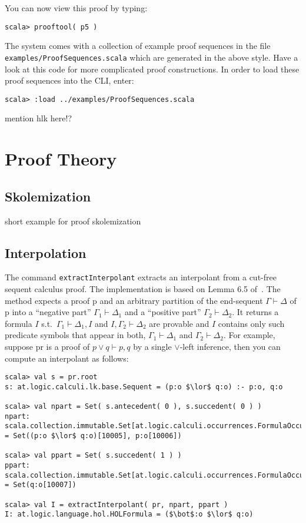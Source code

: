 \documentclass[a4paper,11pt]{article}
\newcommand{\seq}{\vdash}	%
\renewcommand{\lor}{\vee}
\newenvironment{meta}{\color{red}}{\color{black}}
\begin{document}
%
You can now view this proof by typing:
\begin{lstlisting}
scala> prooftool( p5 )
\end{lstlisting}

The system comes with a collection of example proof sequences in the file
{\tt examples/ProofSequences.scala} which are generated in the above style.
Have a look at this code for more complicated proof constructions. In order
to load these proof sequences into the CLI, enter:
\begin{lstlisting}
scala> :load ../examples/ProofSequences.scala
\end{lstlisting}

\begin{meta}
mention hlk here!?
\end{meta}


\section{Proof Theory}

\subsection{Skolemization}

\begin{meta}
short example for proof skolemization 
\end{meta}


\subsection{Interpolation}

The command \texttt{extractInterpolant} extracts an interpolant from a cut-free
sequent calculus proof. The implementation is based on Lemma 6.5 of~\cite{Takeuti87Proof}. The method expects
a proof p and an arbitrary partition of the end-sequent $\Gamma \seq \Delta$ of p into a 
``negative part'' $\Gamma_1\seq\Delta_1$ and a ``positive part'' $\Gamma_2 \seq \Delta_2$.
It returns a formula $I$ s.t.\ $\Gamma_1\seq\Delta_1, I$ and $I,\Gamma_2\seq\Delta_2$
are provable and $I$ contains only such predicate symbols that appear in both, $\Gamma_1\seq\Delta_1$
and $\Gamma_2\seq\Delta_2$. For example, suppose pr is a proof of $p \lor q \seq p, q$
by a single $\lor$-left inference, then you can compute an interpolant as follows:
\begin{lstlisting}
scala> val s = pr.root
s: at.logic.calculi.lk.base.Sequent = (p:o $\lor$ q:o) :- p:o, q:o

scala> val npart = Set( s.antecedent( 0 ), s.succedent( 0 ) )
npart: scala.collection.immutable.Set[at.logic.calculi.occurrences.FormulaOccurrence] = Set((p:o $\lor$ q:o)[10005], p:o[10006])

scala> val ppart = Set( s.succedent( 1 ) )
ppart: scala.collection.immutable.Set[at.logic.calculi.occurrences.FormulaOccurrence] = Set(q:o[10007])

scala> val I = extractInterpolant( pr, npart, ppart )
I: at.logic.language.hol.HOLFormula = ($\bot$:o $\lor$ q:o)
\end{lstlisting}
\end{document}
